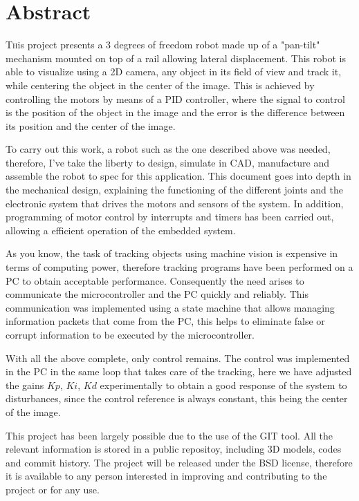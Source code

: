 

\chapter*{Abstract}
\pagestyle{especial}
{}

\lettrine[lraise=-0.1, lines=2, loversize=0.2]{T}{h}is project presents a 3 degrees of freedom robot made up of a "pan-tilt" mechanism
mounted on top of a rail allowing lateral displacement. This robot is able to visualize
using a 2D camera, any object in its field of view and track it, while centering the object in the center of the image. This is achieved by 
controlling the motors by means of a PID controller, where the signal to control is the position of the object in the image and the error is the 
difference between its position and the center of the image.

To carry out this work, a robot such as the one described above was needed, therefore,
I've take the liberty to design, simulate in CAD, manufacture and assemble the robot to spec for this application.
This document goes into depth in the mechanical design, explaining the functioning of the different joints
and the electronic system that drives the motors and sensors of the system. In addition,
programming of motor control by interrupts and timers has been carried out, allowing a
efficient operation of the embedded system.

As you know, the task of tracking objects using machine vision is expensive in terms of computing power, therefore tracking programs have been 
performed on a PC to obtain acceptable performance. Consequently the need arises to communicate the microcontroller and the PC quickly and reliably. 
This communication was implemented using a state machine that allows managing information packets
that come from the PC, this helps to eliminate false or corrupt information to be executed by the microcontroller.

With all the above complete, only control remains. The control was implemented in the PC in the same loop that takes care of the
tracking, here we have adjusted the gains $Kp$, $Ki$, $Kd$ experimentally to obtain a
good response of the system to disturbances, since the control reference is always constant, this being the center of the image.

This project has been largely possible due to the use of the GIT tool. All the relevant information is stored in a public repositoy, including 3D models,
codes and commit history. The project will be released under the BSD license, therefore it is available
to any person interested in improving and contributing to the project or for any use.



